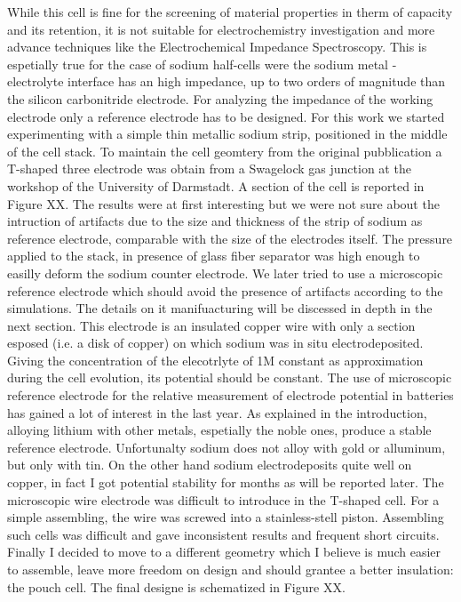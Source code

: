 While this cell is fine for the screening of material properties in therm of capacity and its retention, it is not suitable for electrochemistry investigation and more advance techniques like the Electrochemical Impedance Spectroscopy. This is espetially true for the case of sodium half-cells were the sodium metal -  electrolyte interface has an high impedance, up to two orders of magnitude than the silicon carbonitride electrode. For analyzing the impedance of the working electrode only a reference electrode has to be designed. For this work we started experimenting with a simple thin metallic sodium strip, positioned in the middle of the cell stack. To maintain the cell geomtery from the original pubblication a T-shaped three electrode was obtain from a Swagelock gas junction at the workshop of the University of Darmstadt. A section of the cell is reported in Figure XX. The results were at first interesting but we were not sure about the intruction of artifacts due to the size and thickness of the strip of sodium as reference electrode, comparable with the size of the electrodes itself. The pressure applied to the stack, in presence of glass fiber separator was high enough to easilly deform the sodium counter electrode. We later tried to use a microscopic reference electrode which should avoid the presence of artifacts according to the simulations. The details on it manifuacturing will be discessed in depth in the next section. This electrode is an insulated copper wire with only a section esposed (i.e. a disk of copper) on which sodium was in situ electrodeposited. Giving the concentration of the elecotrlyte of 1M constant as approximation during the cell evolution, its potential should be constant. The use of microscopic reference electrode for the relative measurement of electrode potential in batteries has gained a lot of interest in the last year. As explained in the introduction, alloying lithium with other metals, espetially the noble ones, produce a stable reference electrode. Unfortunalty sodium does not alloy with gold or alluminum, but only with tin. On the other hand sodium electrodeposits quite well on copper, in fact I got potential stability for months as will be reported later. The microscopic wire electrode was difficult to introduce in the T-shaped cell. For a simple assembling, the wire was screwed into a stainless-stell piston. Assembling such cells was difficult and gave inconsistent results and frequent short circuits. Finally I decided to move to a different geometry which I believe is much easier to assemble, leave more freedom on design and should grantee a better insulation: the pouch cell. The final designe is schematized in Figure XX.

